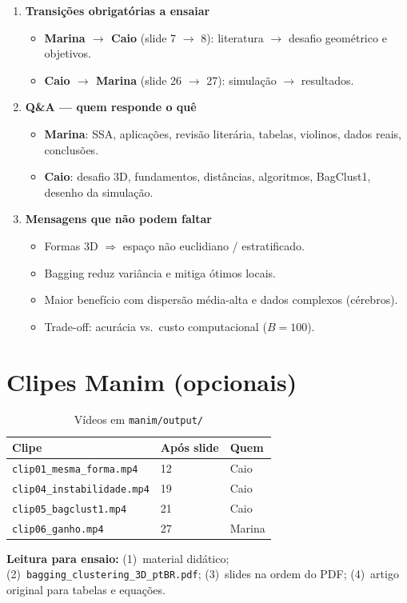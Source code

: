 \documentclass[12pt,a4paper]{article}
\begin{document}
\begin{enumerate}[leftmargin=*]
  \item \textbf{Transições obrigatórias a ensaiar}
  \begin{itemize}
    \item \textbf{Marina $\rightarrow$ Caio} (slide 7 $\rightarrow$ 8): literatura $\rightarrow$ desafio geométrico e objetivos.
    \item \textbf{Caio $\rightarrow$ Marina} (slide 26 $\rightarrow$ 27): simulação $\rightarrow$ resultados.
  \end{itemize}

  \item \textbf{Q\&A --- quem responde o quê}
  \begin{itemize}
    \item \textbf{Marina}: SSA, aplicações, revisão literária, tabelas, violinos, dados reais, conclusões.
    \item \textbf{Caio}: desafio 3D, fundamentos, distâncias, algoritmos, BagClust1, desenho da simulação.
  \end{itemize}

  \item \textbf{Mensagens que não podem faltar}
  \begin{itemize}
    \item Formas 3D $\Rightarrow$ espaço não euclidiano / estratificado.
    \item Bagging reduz variância e mitiga ótimos locais.
    \item Maior benefício com dispersão média-alta e dados complexos (cérebros).
    \item Trade-off: acurácia vs.\ custo computacional ($B=100$).
  \end{itemize}
\end{enumerate}

\section{Clipes Manim (opcionais)}

\begin{table}[h]
\centering
\small
\begin{tabular}{@{}lll@{}}
\toprule
\textbf{Clipe} & \textbf{Após slide} & \textbf{Quem} \\
\midrule
\texttt{clip01\_mesma\_forma.mp4} & 12 & Caio \\
\texttt{clip04\_instabilidade.mp4} & 19 & Caio \\
\texttt{clip05\_bagclust1.mp4} & 21 & Caio \\
\texttt{clip06\_ganho.mp4} & 27 & Marina \\
\bottomrule
\end{tabular}
\caption{Vídeos em \texttt{manim/output/}}
\end{table}

\vspace{1em}
\noindent
\textbf{Leitura para ensaio:}
(1)~material didático;
(2)~\texttt{bagging\_clustering\_3D\_ptBR.pdf};
(3)~slides na ordem do PDF;
(4)~artigo original para tabelas e equações.
\end{document}
